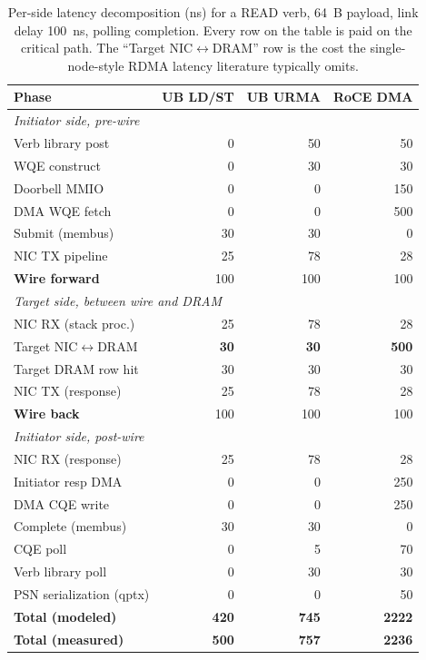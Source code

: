 \documentclass[10pt,twocolumn]{article}
\begin{document}
\begin{table}[h]
\centering\footnotesize
\setlength{\tabcolsep}{3pt}
\caption{Per-side latency decomposition (ns) for a READ verb,
64~B payload, link delay 100~ns, polling completion. Every row
on the table is paid on the critical path. The ``Target NIC$\leftrightarrow$DRAM''
row is the cost the single-node-style RDMA latency literature
typically omits.}
\label{tab:per-side}
\begin{tabular}{l|rrr}
\toprule
Phase                            & UB LD/ST & UB URMA & RoCE DMA \\
\midrule
\multicolumn{4}{l}{\textit{Initiator side, pre-wire}} \\
\quad Verb library post          & 0   & 50  & 50  \\
\quad WQE construct              & 0   & 30  & 30  \\
\quad Doorbell MMIO              & 0   & 0   & 150 \\
\quad DMA WQE fetch              & 0   & 0   & 500 \\
\quad Submit (membus)            & 30  & 30  & 0   \\
\quad NIC TX pipeline            & 25  & 78  & 28  \\
\midrule
\quad \textbf{Wire forward}      & 100 & 100 & 100 \\
\midrule
\multicolumn{4}{l}{\textit{Target side, between wire and DRAM}} \\
\quad NIC RX (stack proc.)       & 25  & 78  & 28  \\
\quad Target NIC$\leftrightarrow$DRAM & \textbf{30}  & \textbf{30}  & \textbf{500} \\
\quad Target DRAM row hit        & 30  & 30  & 30  \\
\quad NIC TX (response)          & 25  & 78  & 28  \\
\midrule
\quad \textbf{Wire back}         & 100 & 100 & 100 \\
\midrule
\multicolumn{4}{l}{\textit{Initiator side, post-wire}} \\
\quad NIC RX (response)          & 25  & 78  & 28  \\
\quad Initiator resp DMA         & 0   & 0   & 250 \\
\quad DMA CQE write              & 0   & 0   & 250 \\
\quad Complete (membus)          & 30  & 30  & 0   \\
\quad CQE poll                   & 0   & 5   & 70  \\
\quad Verb library poll          & 0   & 30  & 30  \\
\quad PSN serialization (qptx)   & 0   & 0   & 50  \\
\midrule
\textbf{Total (modeled)}         & \textbf{420}  & \textbf{745}  & \textbf{2222}  \\
\textbf{Total (measured)}        & \textbf{500}  & \textbf{757}  & \textbf{2236}  \\
\bottomrule
\end{tabular}
\end{table}
\end{document}
